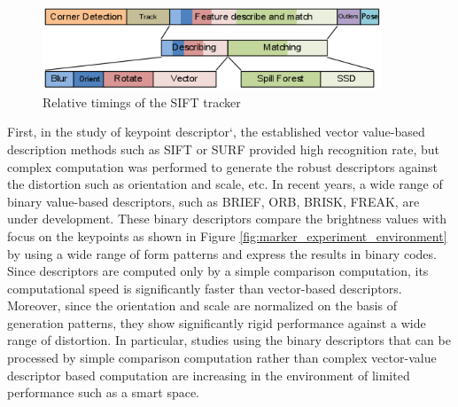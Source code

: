 \begin{figure}[hb!]
\centering
\includegraphics[width=0.9\textwidth]{2_relworks/time_comparison}
\caption{Relative timings of the SIFT tracker \cite{wagner_pose_2008}}
\label{fig:markerless_relative_timings}
\end{figure}



First, in the study of keypoint descriptor`, the established vector value-based description methods such as SIFT\cite{lowe_distinctive_2004} or SURF\cite{bay_speeded-up_2008} provided high recognition rate, but complex computation was performed to generate the robust descriptors against the distortion such as orientation and scale, etc. In recent years, a wide range of binary value-based descriptors, such as  BRIEF\cite{calonder_brief:_2010}, ORB\cite{rublee_orb:_2011}, BRISK\cite{leutenegger_brisk:_2011}, FREAK\cite{alahi_freak:_2012}, are under development. These binary descriptors compare the brightness values with focus on the keypoints as shown in Figure \ref{fig:marker_experiment_environment} by using a wide range of form patterns and express the results in binary codes. Since descriptors are computed only by a simple comparison computation, its computational speed is significantly faster than vector-based descriptors. Moreover, since the orientation and scale are normalized on the basis of generation patterns, they show significantly rigid performance against a wide range of distortion. In particular, studies using the binary descriptors that can be processed by simple comparison computation rather than complex vector-value descriptor based computation are increasing in the environment of limited performance such as a smart space.  

